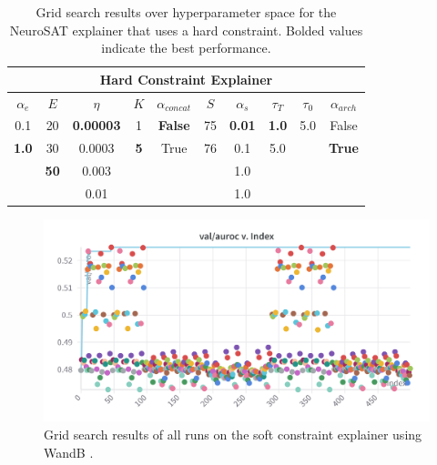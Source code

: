 \begin{table}[h]
    \centering
    \scriptsize
    \begin{tabular}{|c|c|c|c|c|c|c|c|c|c|}
    \hline
    \multicolumn{10}{|c|}{\textbf{Hard Constraint Explainer}} \\ \hline
    $\alpha_e$ & $E$ & $\eta$ & $K$ & $\alpha_{concat}$ & $S$ & $\alpha_s$ & $\tau_T$ & $\tau_0$ & $\alpha_{arch}$ \\ \hline
    0.1 & 20 & \textbf{0.00003} & 1  & \textbf{False} & 75 & \textbf{0.01} & \textbf{1.0} & 5.0 & False \\
    \textbf{1.0} & 30 & 0.0003  & \textbf{5}  & True  & 76 & 0.1 & 5.0 &  & \textbf{True}  \\
    &  \textbf{50} & 0.003   &  &       &     &   1.0   &      &      &       \\
    &   & 0.01   &  &       &     &   1.0   &      &      &       \\ \hline
    \end{tabular}
    \caption[NeuroSAT hard constraint Sweep]{Grid search results over hyperparameter space for the NeuroSAT explainer that uses a hard constraint. Bolded values indicate the best performance.
    \label{tab:sweep_conf_hard}
    }
\end{table}

\begin{figure}
  \includegraphics[width=\linewidth]{img/NeuroSAT-soft_sweep.png}
  \caption[Grid search results of soft constraint explainer]{Grid search results of all runs on the soft constraint explainer using WandB \cite{wandb}.}
  \label{fig:soft-sweep}
\end{figure}

